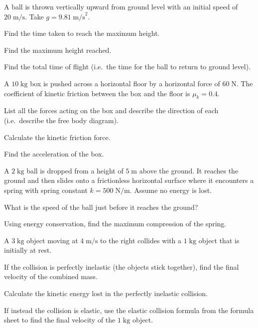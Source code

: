 \documentclass[12pt,a4paper]{article}
\begin{document}
\begin{parts}
\item A ball is thrown vertically upward from ground level with an initial speed of $20\;\text{m/s}$. Take $g = 9.81\;\text{m/s}^2$.
\begin{parts}
\item Find the time taken to reach the maximum height. 
\item Find the maximum height reached. 
\item Find the total time of flight (i.e.\ the time for the ball to return to ground level). 
\end{parts}

\item A $10\;\text{kg}$ box is pushed across a horizontal floor by a horizontal force of $60\;\text{N}$. The coefficient of kinetic friction between the box and the floor is $\mu_k = 0.4$.
\begin{parts}
\item List all the forces acting on the box and describe the direction of each (i.e.\ describe the free body diagram). 
\item Calculate the kinetic friction force. 
\item Find the acceleration of the box. 
\end{parts}

\item A $2\;\text{kg}$ ball is dropped from a height of $5\;\text{m}$ above the ground. It reaches the ground and then slides onto a frictionless horizontal surface where it encounters a spring with spring constant $k = 500\;\text{N/m}$. Assume no energy is lost.
\begin{parts}
\item What is the speed of the ball just before it reaches the ground? 
\item Using energy conservation, find the maximum compression of the spring. 
\end{parts}

\item A $3\;\text{kg}$ object moving at $4\;\text{m/s}$ to the right collides with a $1\;\text{kg}$ object that is initially at rest.
\begin{parts}
\item If the collision is perfectly inelastic (the objects stick together), find the final velocity of the combined mass. 
\item Calculate the kinetic energy lost in the perfectly inelastic collision. 
\item If instead the collision is elastic, use the elastic collision formula from the formula sheet to find the final velocity of the $1\;\text{kg}$ object. 
\end{parts}
\end{parts}
\end{document}
